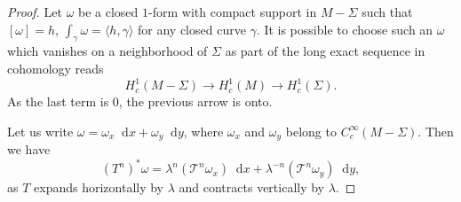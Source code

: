 \documentclass[10pt]{amsart}
\newcommand{\boT}{\mathcal{T}}
\newcommand{\dd}{\mathop{}\!\mathrm{d}}
\theoremstyle{definition}
\numberwithin{equation}{section}
\begin{document}
\begin{proof}
Let $\omega$ be a closed $1$-form with compact support in $M-\Sigma$ such
that $[\omega] = h$, \ie $\int_\gamma \omega = \langle h, \gamma \rangle$
for any closed curve $\gamma$. It is possible to choose such an $\omega$
which vanishes on a neighborhood of $\Sigma$ as part of the long exact
sequence in cohomology reads
\[
H^1_c(M-\Sigma) \to H^1_c(M) \to
H^1_c(\Sigma).
\]
As the last term is $0$, the previous arrow is onto.

Let us write $\omega = \omega_x \dd x + \omega_y \dd y$, where $\omega_x$ and
$\omega_y$ belong to $C^\infty_c(M-\Sigma)$. Then we have
\begin{equation*}
(T^n)^* \omega = \lambda^n (\boT^n \omega_x) \dd x + \lambda^{-n} (\boT^n \omega_y) \dd y,
\end{equation*}
as $T$ expands horizontally by $\lambda$ and contracts vertically by
$\lambda$.


\end{proof}
\end{document}
